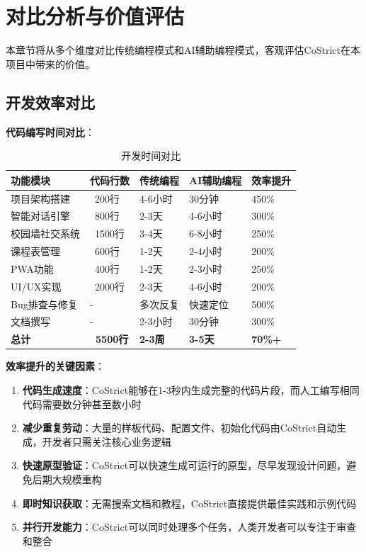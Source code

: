 ﻿\documentclass[12pt,a4paper]{article}
\begin{document}
\section{对比分析与价值评估}

本章节将从多个维度对比传统编程模式和AI辅助编程模式，客观评估CoStrict在本项目中带来的价值。

\subsection{开发效率对比}

\textbf{代码编写时间对比}：

\begin{table}[h]
\centering
\begin{tabular}{|l|l|l|l|l|}
\hline
\textbf{功能模块} & \textbf{代码行数} & \textbf{传统编程} & \textbf{AI辅助编程} & \textbf{效率提升} \\
\hline
项目架构搭建 & ~200行 & 4-6小时 & 30分钟 & 450\% \\
\hline
智能对话引擎 & ~800行 & 2-3天 & 4-6小时 & 300\% \\
\hline
校园墙社交系统 & ~1500行 & 3-4天 & 6-8小时 & 250\% \\
\hline
课程表管理 & ~600行 & 1-2天 & 2-4小时 & 200\% \\
\hline
PWA功能 & ~400行 & 1-2天 & 2-3小时 & 250\% \\
\hline
UI/UX实现 & ~2000行 & 2-3天 & 4-6小时 & 200\% \\
\hline
Bug排查与修复 & - & 多次反复 & 快速定位 & 500\% \\
\hline
文档撰写 & - & 2-3小时 & 30分钟 & 300\% \\
\hline
\textbf{总计} & \textbf{~5500行} & \textbf{2-3周} & \textbf{3-5天} & \textbf{70\%+} \\
\hline
\end{tabular}
\caption{开发时间对比}
\end{table}

\textbf{效率提升的关键因素}：

\begin{enumerate}
    \item \textbf{代码生成速度}：CoStrict能够在1-3秒内生成完整的代码片段，而人工编写相同代码需要数分钟甚至数小时
    \item \textbf{减少重复劳动}：大量的样板代码、配置文件、初始化代码由CoStrict自动生成，开发者只需关注核心业务逻辑
    \item \textbf{快速原型验证}：CoStrict可以快速生成可运行的原型，尽早发现设计问题，避免后期大规模重构
    \item \textbf{即时知识获取}：无需搜索文档和教程，CoStrict直接提供最佳实践和示例代码
    \item \textbf{并行开发能力}：CoStrict可以同时处理多个任务，人类开发者可以专注于审查和整合
\end{enumerate}
\end{document}
